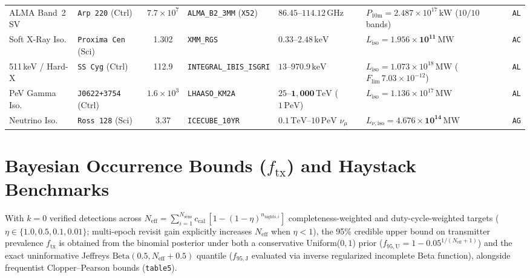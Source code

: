 \documentclass[twocolumn,10pt]{article}
\begin{document}
\begin{table}[t]
{\begin{tabular}{llclllr}
ALMA Band~2 SV & \texttt{Arp\,220} (Ctrl) & $7.7\times 10^7$ & \texttt{ALMA\_B2\_3MM} (\texttt{X52}) & $86.45\text{--}114.12\,\mathrm{GHz}$ & $P_{10\mathrm{m}} = 2.487\times 10^{17}\,\mathrm{kW}$ ($10/10$ bands) & \texttt{AL} \\
Soft X-Ray Iso. & \texttt{Proxima Cen} (Sci) & 1.302 & \texttt{XMM\_RGS} & $0.33\text{--}2.48\,\mathrm{keV}$ & $L_{\mathrm{iso}} = \mathbf{1.956\times 10^{11}\,\mathrm{MW}}$ & \texttt{AC} \\
511\,keV / Hard-X & \texttt{SS\,Cyg} (Ctrl) & 112.9 & \texttt{INTEGRAL\_IBIS\_ISGRI} & $13\text{--}970.9\,\mathrm{keV}$ & $L_{\mathrm{iso}} = 1.073\times 10^{18}\,\mathrm{MW}$ ($F_{\mathrm{lim}}\,7.03\times 10^{-12}$) & \texttt{AL} \\
PeV Gamma Iso. & \texttt{J0622+3754} (Ctrl) & $1.6\times 10^3$ & \texttt{LHAASO\_KM2A} & $25\text{--}\mathbf{1{,}000\,\mathrm{TeV}}$ ($1\,\mathrm{PeV}$) & $L_{\mathrm{iso}} = 1.136\times 10^{17}\,\mathrm{MW}$ & \texttt{AL} \\
Neutrino Iso. & \texttt{Ross\,128} (Sci) & 3.37 & \texttt{ICECUBE\_10YR} & $0.1\,\mathrm{TeV}\text{--}10\,\mathrm{PeV}$ $\nu_\mu$ & $L_{\nu,\mathrm{iso}} = \mathbf{4.676\times 10^{14}\,\mathrm{MW}}$ & \texttt{AG} \\
\bottomrule
\end{tabular}%
}
\end{table}

\section{Bayesian Occurrence Bounds ($f_{\mathrm{tx}}$) and Haystack Benchmarks}
\label{sec:bayesian}

With $k = 0$ verified detections across $N_{\mathrm{eff}} = \sum_{i=1}^{N_{\mathrm{sens}}} c_{\mathrm{cal}}\,[1 - (1 - \eta)^{n_{\mathrm{nights},i}}]$ completeness-weighted and duty-cycle-weighted targets ($\eta \in \{1.0, 0.5, 0.1, 0.01\}$; multi-epoch revisit gain explicitly increases $N_{\mathrm{eff}}$ when $\eta < 1$), the 95\% credible upper bound on transmitter prevalence $f_{\mathrm{tx}}$ is obtained from the binomial posterior under both a conservative Uniform($0,1$) prior ($f_{95,\mathrm{U}} = 1 - 0.05^{1/(N_{\mathrm{eff}}+1)}$) and the exact uninformative Jeffreys $\mathrm{Beta}(0.5, N_{\mathrm{eff}}+0.5)$ quantile ($f_{95,\mathrm{J}}$ evaluated via inverse regularized incomplete Beta function), alongside frequentist Clopper--Pearson bounds (\texttt{table5}).
\end{document}
